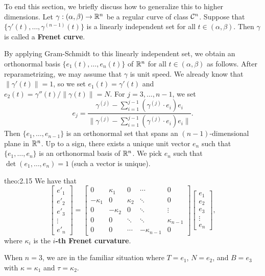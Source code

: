 To end this section, we briefly discuss how to generalize this to higher dimensions. 
Let $\gamma : (\alpha, \beta) \to \mathbb{R}^n$ be a regular curve of class ${\cal C}^n$. 
Suppose that $\{\gamma'(t), \dots, \gamma^{(n-1)}(t)\}$ is a linearly 
independent set for all $t \in (\alpha, \beta)$. Then $\gamma$ 
is called a {\bf Frenet curve}. 

By applying Gram-Schmidt to this linearly independent set, we obtain an orthonormal 
basis $\{e_1(t), \dots, e_n(t)\}$ of $\mathbb{R}^n$ for all $t \in (\alpha, \beta)$ 
as follows. After reparametrizing, we may assume that $\gamma$ is unit speed. 
We already know that $\|\gamma'(t)\| = 1$, so we set $e_1(t) = \gamma'(t)$ and 
$e_2(t) = \gamma''(t)/\|\gamma(t)\| = N$. For $j = 3, \dots, n-1$, we set 
\[ e_j = \frac{\gamma^{(j)} - \sum_{i=1}^{j-1}(\gamma^{(j)} \cdot e_i)e_i}
{\|\gamma^{(j)} - \sum_{i=1}^{j-1}(\gamma^{(j)} \cdot e_i)e_i\|}. \] 
Then $\{e_1, \dots, e_{n-1}\}$ is an orthonormal set that spans an 
$(n-1)$-dimensional plane in $\mathbb{R}^n$. Up to a sign, there exists a unique 
unit vector $e_n$ such that $\{e_1, \dots, e_n\}$ is an orthonormal basis 
of $\mathbb{R}^n$. We pick $e_n$ such that $\det(e_1, \dots, e_n) = 1$ (such a 
vector is unique). 

\begin{theo}{theo:2.15}
    We have that 
    \[ \begin{bmatrix}
        e'_1 \\[5pt] e'_2 \\[5pt] e'_3 \\[5pt] \vdots \\[5pt] e'_n 
    \end{bmatrix} = \begin{bmatrix}
        0 & \kappa_1 & 0 & \cdots & 0 \\ 
        -\kappa_1 & 0 & \kappa_2 & \ddots & 0 \\ 
        0 & -\kappa_2 & 0 & \ddots & \vdots \\ 
        0 & 0 & \ddots & \ddots & \kappa_{n-1} \\[5pt] 
        0 & 0 & \cdots & -\kappa_{n-1} & 0
    \end{bmatrix} \begin{bmatrix}
        e_1 \\[5pt] e_2 \\[5pt] e_3 \\[5pt] \vdots \\[5pt] e_n
    \end{bmatrix}, \] 
    where $\kappa_i$ is the {\bf $i$-th Frenet curvature}. 
\end{theo}\vspace{-0.25cm}

When $n = 3$, we are in the familiar situation where 
$T = e_1$, $N = e_2$, and $B = e_3$ with $\kappa = \kappa_1$ and 
$\tau = \kappa_2$. 